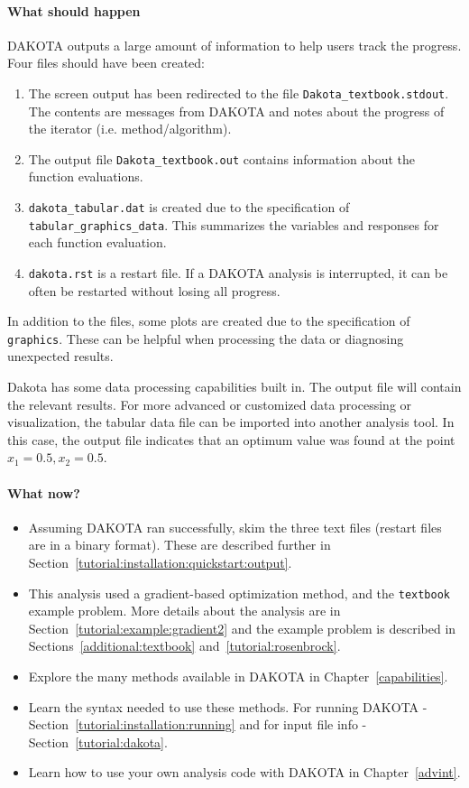 \paragraph{What should happen}
DAKOTA outputs a large amount of information to help users track the progress. Four files should have been created:
\begin{enumerate}
  \item The screen output has been redirected to the file \texttt{Dakota\_textbook.stdout}. \\
  The contents are messages from DAKOTA and notes about the progress of the iterator (i.e. method/algorithm).
  \item The output file \texttt{Dakota\_textbook.out} contains information about the function evaluations.
  \item \texttt{dakota\_tabular.dat} is created due to the specification of \texttt{tabular\_graphics\_data}. This summarizes the variables and responses for each function evaluation.
  \item \texttt{dakota.rst} is a restart file. If a DAKOTA analysis is interrupted, it can be often be restarted without losing all progress.
\end{enumerate}
In addition to the files, some plots are created due to the specification of \texttt{graphics}. These can be helpful when processing the data or diagnosing unexpected results.

Dakota has some data processing capabilities built in. The output file will contain the relevant results. For more advanced or customized data processing or visualization, the tabular data file can be imported into another analysis tool. In this case, the output file indicates that an optimum value was found at the point $x_1 = 0.5, x_2 = 0.5$.

\paragraph{What now?}
\begin{itemize}
  \item Assuming DAKOTA ran successfully, skim the three text files (restart files are in a binary format). These are described further in Section~\ref{tutorial:installation:quickstart:output}.
  \item This analysis used a gradient-based optimization method, and the \texttt{textbook} example problem. More details about the analysis are in Section~\ref{tutorial:example:gradient2} and the example problem is described in Sections~\ref{additional:textbook} and~\ref{tutorial:rosenbrock}.
  \item Explore the many methods available in DAKOTA in Chapter~\ref{capabilities}.
  \item Learn the syntax needed to use these methods. For running DAKOTA - Section~\ref{tutorial:installation:running} and for input file info - Section~\ref{tutorial:dakota}. 
  \item Learn how to use your own analysis code with DAKOTA in Chapter~\ref{advint}.
\end{itemize}


